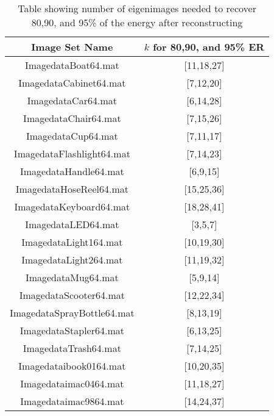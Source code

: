 \documentclass[10pt,twocolumn,letterpaper]{article}
\begin{document}
\begin{table}
\caption{Table showing number of eigenimages needed to recover 80,90, and 95\% of the energy after reconstructing}
\begin{tabular}{ c | c } 
\hline
Image Set Name & $k$ for 80,90, and 95\% ER\\
\hline 
ImagedataBoat64.mat &[11,18,27]\\
ImagedataCabinet64.mat&[7,12,20]\\
ImagedataCar64.mat&[6,14,28]\\
ImagedataChair64.mat&[7,15,26]\\
ImagedataCup64.mat&[7,11,17]\\
ImagedataFlashlight64.mat	&[7,14,23]\\
ImagedataHandle64.mat&[6,9,15]\\
ImagedataHoseReel64.mat&[15,25,36]\\
ImagedataKeyboard64.mat&[18,28,41]\\
ImagedataLED64.mat&[3,5,7]\\
ImagedataLight164.mat	&[10,19,30]\\
ImagedataLight264.mat	&[11,19,32]\\
ImagedataMug64.mat&[5,9,14]\\
ImagedataScooter64.mat&[12,22,34]\\
ImagedataSprayBottle64.mat&[8,13,19]\\
ImagedataStapler64.mat&[6,13,25]\\
ImagedataTrash64.mat&[7,14,25]\\
Imagedataibook0164.mat&[10,20,35]\\
Imagedataimac0464.mat	&[11,18,27]\\
Imagedataimac9864.mat	&[14,24,37]\\
\hline
\end{tabular}
\label{table:kforMu}
\end{table}
\end{document}
